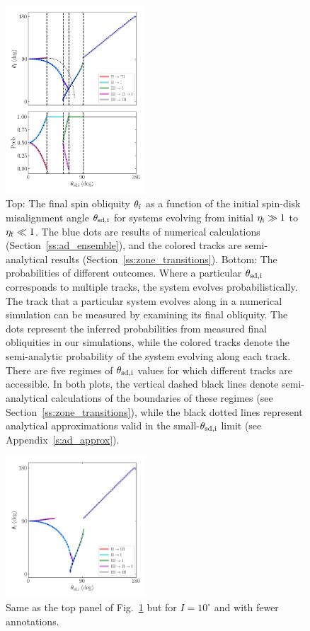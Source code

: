 \begin{figure}
    \centering
    \includegraphics[width=0.47\textwidth]{plots_diskdisp/3_ensemble_05_35.png}
    \caption{Top: The final spin obliquity $\theta_{\rm f}$ as a function of the
    initial spin-disk misalignment angle $\theta_{\rm sd, i}$ for systems
    evolving from initial $\eta_{\rm i} \gg 1$ to $\eta_{\rm f} \ll 1$. The blue
    dots are results of numerical calculations (Section~\ref{ss:ad_ensemble}),
    and the colored tracks are semi-analytical results
    (Section~\ref{ss:zone_transitions}). Bottom: The probabilities of different
    outcomes. Where a particular $\theta_{\rm sd, i}$ corresponds to multiple
    tracks, the system evolves probabilistically. The track that a particular
    system evolves along in a numerical simulation can be measured by examining
    its final obliquity. The dots represent the inferred probabilities from
    measured final obliquities in our simulations, while the colored tracks
    denote the semi-analytic probability of the system evolving along each
    track. There are five regimes of $\theta_{\rm sd, i}$ values for which
    different tracks are accessible. In both plots, the vertical dashed black
    lines denote semi-analytical calculations of the boundaries of these regimes
    (see Section~\ref{ss:zone_transitions}), while the black dotted lines
    represent analytical approximations valid in the small-$\theta_{\rm sd, i}$
    limit (see Appendix~\ref{s:ad_approx}).}\label{fig:ad_ensemble}
\end{figure}
\begin{figure}
    \centering
    \includegraphics[width=0.47\textwidth]{plots_diskdisp/3_ensemble_10_35.png}
    \caption{Same as the top panel of Fig.~\ref{fig:ad_ensemble} but for $I =
    10^\circ$ and with fewer annotations.}\label{fig:3_ensemble_10_35}
\end{figure}
